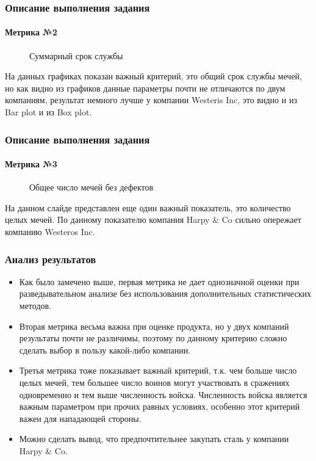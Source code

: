 \documentclass{beamer}
\begin{document}
	\begin{frame}[shrink=4]
		\frametitle{Описание выполнения задания}
		\framesubtitle{Метрика №2}
		\begin{figure}[h!]
			\begin{minipage}[h]{0.49\linewidth}
			\end{minipage}
			\hfill
			\begin{minipage}[h]{0.49\linewidth}
			\end{minipage}
			\caption{Суммарный срок службы}
			\label{ris:2}
		\end{figure}
		На данных графиках показан важный критерий, это общий срок службы мечей, но как видно из графиков данные параметры почти не отличаются по двум компаниям, результат немного лучше у компании Westeris Inc, это видно и из Bar plot и из  Box plot. 
	\end{frame}
	\begin{frame}[shrink=4]
		\frametitle{Описание выполнения задания}
		\framesubtitle{Метрика №3}
		\begin{figure}[h!]
			\begin{minipage}[h]{0.49\linewidth}
			\end{minipage}
			\hfill
			\begin{minipage}[h]{0.49\linewidth}
			\end{minipage}
			\caption{Общее число мечей без дефектов}
			\label{ris:3}
		\end{figure}
		На данном слайде представлен еще один важный показатель, это количество целых мечей. По данному показателю компания Harpy \& Co сильно опережает компанию Westeros Inc.
	\end{frame}
	\begin{frame}
	\frametitle{Анализ результатов}
		\begin{itemize}
			\item {Как было замечено выше, первая метрика не дает однозначной оценки при разведывательном анализе без использования дополнительных статистических методов.}
			\item {Вторая метрика весьма важна при оценке продукта, но у двух компаний результаты почти не различимы, поэтому по данному критерию сложно сделать выбор в пользу какой-либо компании. }
			\item {Третья метрика тоже показывает важный критерий, т.к. чем больше число целых мечей, тем большее число воинов могут участвовать в сражениях одновременно и тем выше численность войска. Численность войска является важным параметром при прочих равных условиях, особенно этот критерий важен для нападающей стороны.}
			\item {Можно сделать вывод, что предпочтительнее закупать сталь у компании Harpy \& Co.}
		\end{itemize}
	\end{frame}
\end{document}
